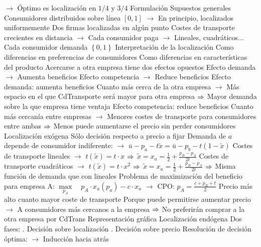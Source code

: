 \documentclass{nuevotema}
\begin{document}
\begin{esquemal}
				\4[] $\to$ Óptimo es localización en $1/4$ y $3/4$
			\3 Formulación
				\4 Supuestos generales
				\4[] Consumidores distribuidos sobre línea $[0,1]$
				\4[] $\to$ En principio, localizados uniformemente
				\4[] Dos firmas localizadas en algún punto
				\4[] Costes de transporte crecientes en distancia
				\4[] $\to$ Cada consumidor paga
				\4[] $\to$ Lineales, cuadráticos...
				\4[] Cada consumidor demanda $\left\lbrace 0, 1 \right\rbrace$
				\4[] 
				\4 Interpretación de la localización
				\4[] Como diferencias en preferencias de consumidores
				\4[] Como diferencias en características del producto
				\4 Acercarse a otra empresa tiene dos efectos opuestos
				\4[] Efecto demanda
				\4[] $\to$ Aumenta beneficios
				\4[] Efecto competencia
				\4[] $\to$ Reduce beneficios
				\4 Efecto demanda: aumenta beneficios
				\4[] Cuanto más cerca de la otra empresa
				\4[] $\to$ Más espacio en el que CdTransporte será mayor para otra empresa
				\4[] $\then$ Mayor demanda sobre la que empresa tiene ventaja
				\4 Efecto competencia: reduce beneficios
				\4[] Cuanto más cercanía entre empresas
				\4[] $\to$ Menores costes de transporte para consumidores entre ambas
				\4[] $\then$ Menos puede aumentarse el precio sin perder consumidores
				\4 Localización exógena
				\4[] Sólo decisión respecto a precio a fijar
				\4[] Demanda de $a$ depende de consumidor indiferente:
				\4[] $\to$ $\bar{u} - p_a - t \tilde {x}= \bar{u} - p_b - t (1 - \tilde{x})$
				\4[] Costes de transporte lineales
				\4[] $\to$ $t(\tilde{x}) = t \cdot x$
				\4[] $\then$ $\tilde{x} = x_a = \frac{1}{2} + \frac{p_B - p_A}{2t}$
				\4[] Costes de transporte cuadráticos
				\4[] $\to$ $t(\tilde{x}) = t \cdot x^2$
				\4[] $\then$ $\tilde{x} = x_a = \frac{1}{2} + \frac{p_B - p_A}{2t}$
				\4[] $\then$ Misma función de demanda que con lineales
				\4[] Problema de maximización del beneficio para empresa A:
				\4[] $\underset{p_A}{\max}\quad p_A \cdot x_a (p_a) - c \cdot x_a$
				\4[] $\to$ CPO: $p_A = \frac{c+p_B+t}{2}$
				\4[$\then$] 
				\4[$\then$] Precio más alto cuanto mayor coste de transporte
				\4[] Porque puede permitirse aumentar precio
				\4[] $\to$ A consumidores más cercanos a la empresa
				\4[] $\then$ No preferirán comprar a la otra empresa por CdTrans
				\4[] Representación gráfica
				\4[] 
				\4 Localización endógena
				\4[] Dos fases:
				. Decisión sobre localización
				. Decisión sobre precio
				\4[] Resolución de decisión óptima:
				\4[] $\to$ Inducción hacia atrás

\end{esquemal}
\end{document}
